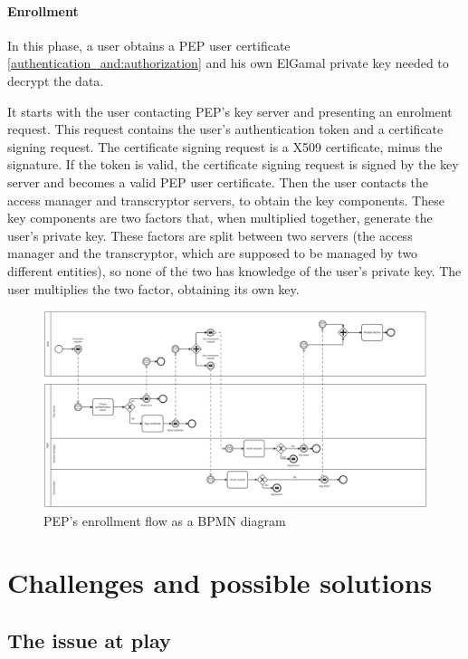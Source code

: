 \documentclass{report}
\begin{document}
\subsubsection{Enrollment}
In this phase, a user obtains a PEP user certificate \ref{authentication_and:authorization} and his own ElGamal private key needed to decrypt the data. \par
It starts with the user contacting PEP's key server and presenting an enrolment request. This request contains the user's authentication token and a certificate signing request.
The certificate signing request is a X509 certificate, minus the signature. If the token is valid, the certificate signing request is signed by the key server and becomes a valid
PEP user certificate. Then the user contacts the access manager and transcryptor servers, to obtain the key components. These key components are two factors that, when multiplied 
together, generate the user's private key. These factors are split between two servers (the access manager and the transcryptor, which are supposed to be managed by two different
entities), so none of the two has knowledge of the user's private key. The user multiplies the two factor, obtaining its own key.

\begin{figure}[H]
	\includegraphics[scale=0.1, angle=-90]{enrollment}
	\caption{PEP's enrollment flow as a BPMN diagram}
	\label{bpmn-enrollment-flow}
\end{figure}


\chapter{Challenges and possible solutions}
\section{The issue at play}
\end{document}
